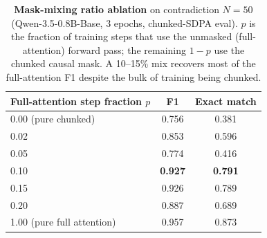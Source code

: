 \begin{table}[ht]
\centering
\small
\begin{tabular}{lcc}
\toprule
Full-attention step fraction $p$ & F1 & Exact match \\
\midrule
0.00 (pure chunked) & 0.756 & 0.381 \\
0.02 & 0.853 & 0.596 \\
0.05 & 0.774 & 0.416 \\
0.10 & \textbf{0.927} & \textbf{0.791} \\
0.15 & 0.926 & 0.789 \\
0.20 & 0.887 & 0.689 \\
1.00 (pure full attention) & 0.957 & 0.873 \\
\bottomrule
\end{tabular}
\caption{\textbf{Mask-mixing ratio ablation} on contradiction $N{=}50$ (Qwen-3.5-0.8B-Base, 3 epochs, chunked-SDPA eval). $p$ is the fraction of training steps that use the unmasked (full-attention) forward pass; the remaining $1-p$ use the chunked causal mask. A 10--15\% mix recovers most of the full-attention F1 despite the bulk of training being chunked.}
\label{tab:mask-mix-ablation}
\end{table}
